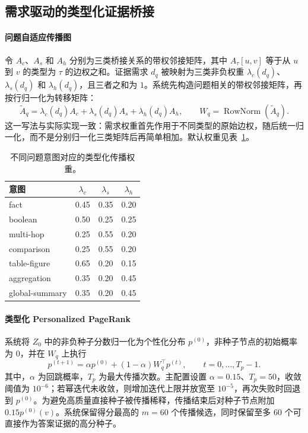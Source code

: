 \subsection{需求驱动的类型化证据桥接}
\label{sec:typed_bridging}

\paragraph{问题自适应传播图}
令 $A_c$、$A_s$ 和 $A_h$ 分别为三类桥接关系的带权邻接矩阵，其中 $A_{\tau}[u,v]$ 等于从 $u$ 到 $v$ 的类型为 $\tau$ 的边权之和。证据需求 $d_q$ 被映射为三类非负权重 $\lambda_c(d_q)$、$\lambda_s(d_q)$ 和 $\lambda_h(d_q)$，且三者之和为 $1$。系统先构造问题相关的带权邻接矩阵，再按行归一化为转移矩阵：
\begin{equation}
\label{eq:typed_transition}
\widetilde{A}_q=
\lambda_c(d_q)A_c+\lambda_s(d_q)A_s+\lambda_h(d_q)A_h,
\qquad
W_q=\operatorname{RowNorm}(\widetilde{A}_q).
\end{equation}
这一写法与实际实现一致：需求权重首先作用于不同类型的原始边权，随后统一归一化，而不是分别归一化三类矩阵后再简单相加。默认权重见表~\ref{tab:demand_weights}。

\begin{table}[t]
\centering
\caption{不同问题意图对应的类型化传播权重。}
\label{tab:demand_weights}
\small
\setlength{\tabcolsep}{4pt}
\begin{tabular}{lccc}
\hline
\textbf{意图} & $\lambda_c$ & $\lambda_s$ & $\lambda_h$ \\
\hline
fact             & 0.45 & 0.35 & 0.20 \\
boolean          & 0.50 & 0.25 & 0.25 \\
multi-hop        & 0.25 & 0.55 & 0.20 \\
comparison       & 0.25 & 0.55 & 0.20 \\
table-figure     & 0.65 & 0.20 & 0.15 \\
aggregation      & 0.35 & 0.20 & 0.45 \\
global-summary   & 0.35 & 0.20 & 0.45 \\
\hline
\end{tabular}
\end{table}

\paragraph{类型化 Personalized PageRank}
系统将 $Z_0$ 中的非负种子分数归一化为个性化分布 $p^{(0)}$，非种子节点的初始概率为 $0$，并在 $W_q$ 上执行
\begin{equation}
\label{eq:typed_ppr}
p^{(t+1)}
=\alpha p^{(0)}+(1-\alpha)W_q^{\top}p^{(t)},
\qquad t=0,\ldots,T_p-1.
\end{equation}
其中，$\alpha$ 为回跳概率，$T_p$ 为最大传播次数。主配置设置 $\alpha=0.15$、$T_p=50$，收敛阈值为 $10^{-6}$；若幂迭代未收敛，则增加迭代上限并放宽至 $10^{-5}$，再次失败时回退到 $p^{(0)}$。为避免高质量直接种子被传播稀释，传播结束后对种子节点附加 $0.15p^{(0)}(v)$。系统保留得分最高的 $m=60$ 个传播候选，同时保留至多 $60$ 个可直接作为答案证据的高分种子。


